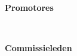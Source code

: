 \thispagestyle{empty}
\noindent \textbf{Promotores} \par
\noindent \coadvisorOne \\ 
\noindent \coadvisorTwo \par
\noindent \coadvisorThree \par


\bigbreak

\noindent \textbf{Commissieleden} \par
\noindent \committeeOne \\ 
\noindent \committeeTwo \\ 
\noindent \committeeThree \\ 
\noindent \committeeFour \\ 
\noindent \clearpage